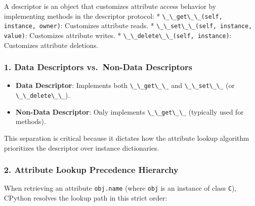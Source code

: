 A descriptor is an object that customizes attribute access behavior by
implementing methods in the descriptor protocol: *
\passthrough{\lstinline!\_\_get\_\_(self, instance, owner)!}: Customizes
attribute reads. *
\passthrough{\lstinline!\_\_set\_\_(self, instance, value)!}: Customizes
attribute writes. *
\passthrough{\lstinline!\_\_delete\_\_(self, instance)!}: Customizes
attribute deletions.

\hypertarget{data-descriptors-vs.-non-data-descriptors}{%
\subsubsection{1. Data Descriptors vs.~Non-Data
Descriptors}\label{data-descriptors-vs.-non-data-descriptors}}

\begin{itemize}
\tightlist
\item
  \textbf{Data Descriptor}: Implements both
  \passthrough{\lstinline!\_\_get\_\_!} and
  \passthrough{\lstinline!\_\_set\_\_!} (or
  \passthrough{\lstinline!\_\_delete\_\_!}).
\item
  \textbf{Non-Data Descriptor}: Only implements
  \passthrough{\lstinline!\_\_get\_\_!} (typically used for methods).
\end{itemize}

This separation is critical because it dictates how the attribute lookup
algorithm prioritizes the descriptor over instance dictionaries.

\hypertarget{attribute-lookup-precedence-hierarchy}{%
\subsubsection{2. Attribute Lookup Precedence
Hierarchy}\label{attribute-lookup-precedence-hierarchy}}

When retrieving an attribute \passthrough{\lstinline!obj.name!} (where
\passthrough{\lstinline!obj!} is an instance of class
\passthrough{\lstinline!C!}), CPython resolves the lookup path in this
strict order:

